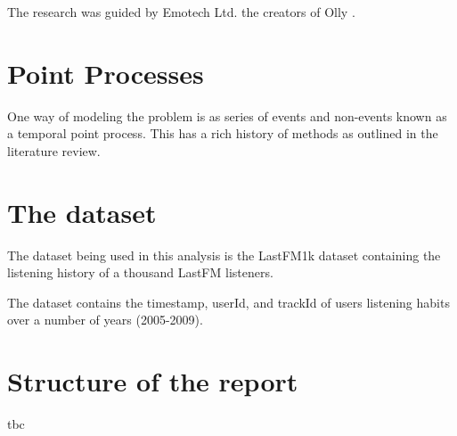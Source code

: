 The research was guided by Emotech Ltd. the creators of Olly \parencite{Olly}.

\section{Point Processes}

One way of modeling the problem is as series of events and non-events known as a temporal point process. This has a rich history of methods as outlined in the literature review. 


\section{The dataset}
The dataset being used in this analysis is the LastFM1k dataset containing the listening history of a thousand LastFM listeners.

The dataset contains the timestamp, userId, and trackId of users listening habits over a number of years (2005-2009).

\section{Structure of the report}
tbc
